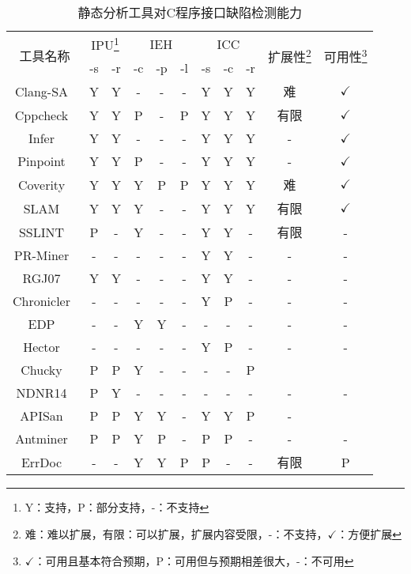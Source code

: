 \begin{table}[t]
	\centering
	\begin{minipage}[t]{0.8\linewidth} %
		\caption{静态分析工具对C程序接口缺陷检测能力}
		\label{tab:3-2-survey}
			\begin{tabular}{ccccccccccc}
			\hline
			\multirow{2}{*}{工具名称} & \multicolumn{2}{c}{IPU\footnote{Y：支持，P：部分支持，-：不支持}} & \multicolumn{3}{c}{IEH} & \multicolumn{3}{c}{ICC} & \multirow{2}{*}{扩展性\footnote{难：难以扩展，有限：可以扩展，扩展内容受限，-：不支持，$\checkmark$：方便扩展}} & \multirow{2}{*}{可用性\footnote{$\checkmark$：可用且基本符合预期，P：可用但与预期相差很大，-：不可用}} \\
			\cline{2-3}\cline{4-6}\cline{7-9}
			 & -s & -r & -c & -p & -l & -s & -c & -r & & \\
			\hline
			Clang-SA~\cite{clang-sa} & Y & Y & - & - & - & Y & Y & Y & 难 & $\checkmark$ \\
			Cppcheck~\cite{cppcheck} & Y & Y & P & - & P & Y & Y & Y & 有限 & $\checkmark$ \\
			Infer~\cite{infer} & Y & Y & - & - & - & Y & Y & Y & - & $\checkmark$ \\
			Pinpoint~\cite{pinpoint} & Y & Y & P & - & - & Y & Y & Y & - & $\checkmark$ \\
			Coverity~\cite{coverity} & Y & Y & Y & P & P & Y & Y & Y & 难 & $\checkmark$ \\
			\hline 
			SLAM~\cite{slam} & Y & Y & Y & - & - & Y & Y & Y & 有限 & $\checkmark$ \\
			SSLINT~\cite{15-sp-sslint} & P & - & Y & - & - & Y & Y & - & 有限 & - \\
			\hline
			PR-Miner~\cite{05-fse-prminer} & - & - & - & - & - & Y & Y & - & - & - \\
			RGJ07~\cite{07-PLDI-RGJ07} & Y & Y & - & - & - & Y & Y & - & - & - \\
			Chronicler~\cite{07-icse-chronicler} & - & - & - & - & - & Y & P & - & - & - \\
			EDP~\cite{08-fast-eio} & - & - & Y & Y & - & - & - & - & - & - \\
			Hector~\cite{13-dsn-hector} & - & - & - & - & - & Y & P & - & - & - \\
			Chucky~\cite{13-ccs-chucky} & P & P & Y & - & - & - & - & P &  & \checkmark \\
			NDNR14~\cite{14-fse-pre} & P & Y & - & - & - & - & - & - & - & - \\
			APISan~\cite{16-sec-apisan} & P & P & Y & Y & - & Y & Y & P & - & \checkmark \\
			Antminer~\cite{16-icse-antminer}& P & P & Y & P & - & P & P & - & - & - \\
			ErrDoc~\cite{17-fse-errdoc}& - & - & Y & Y & P & P & - & - & 有限 & P \\
			\hline
		\end{tabular}
	\end{minipage}
\end{table}